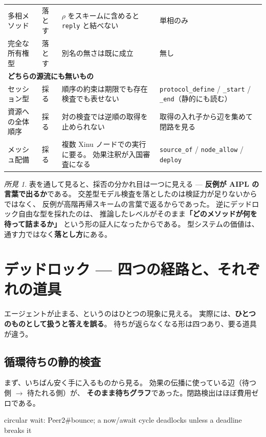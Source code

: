 \documentclass[11pt,a4paper]{ltjsarticle}
\theoremstyle{definition}
\theoremstyle{remark}
\newtheorem{finding}[theorem]{所見}
\begin{document}
\begin{center}
\begin{longtable}{p{}p{}p{}p{}}
多相メソッド & 落とす & $\rho$ をスキームに含めると \texttt{reply} と結べない & 単相のみ \\
完全な所有権型 & 落とす & 別名の無さは既に成立 & 無し \\
\midrule
\multicolumn{4}{l}{\textbf{どちらの源流にも無いもの}}\\
\midrule
セッション型 & 採る & 順序の約束は期限でも存在検査でも表せない &
  \texttt{protocol\_define} / \texttt{\_start} / \texttt{\_end}（静的にも読む） \\
資源への全体順序 & 採る & 対の検査では逆順の取得を止められない &
  取得の入れ子から辺を集めて閉路を見る \\
メッシュ配備 & 採る & 複数 Xinu ノードでの実行に要る。
  効果注釈が入国審査になる &
  \texttt{source\_of} / \texttt{node\_allow} / \texttt{deploy} \\
\bottomrule
\end{longtable}
\end{center}

\begin{finding}
表を通して見ると、採否の分かれ目は一つに見える ---
\textbf{反例が AIPL の言葉で出るか}である。
交差型モデル検査を落としたのは検証力が足りないからではなく、
反例が高階再帰スキームの言葉で返るからであった。
逆にデッドロック自由な型を採れたのは、
推論したレベルがそのまま\textbf{「どのメソッドが何を待って詰まるか」}
という形の証人になったからである。
型システムの価値は、通す力ではなく\textbf{落とし方}にある。
\end{finding}

\section{デッドロック --- 四つの経路と、それぞれの道具}
\label{sec:dl}

エージェントが止まる、というのはひとつの現象に見える。
実際には、\textbf{ひとつのものとして扱うと答えを誤る}。
待ちが返らなくなる形は四つあり、要る道具が違う。

\subsection{循環待ちの静的検査}
\label{sec:deadlock}


まず、いちばん安く手に入るものから見る。
効果の伝播に使っている辺（待つ側 $\to$ 待たれる側）が、
\textbf{そのまま待ちグラフ}であった。閉路検出はほぼ費用ゼロである。

\begin{term}
 circular wait: Peer2#bounce;
             a now/await cycle deadlocks unless a deadline breaks it
\end{term}
\end{document}
